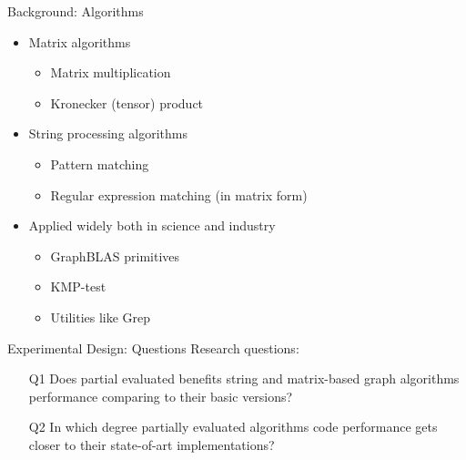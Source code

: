 \documentclass{beamer}
\begin{document}
\begin{frame}{Background: Algorithms}

	\begin{itemize}
		\item Matrix algorithms
		\begin{itemize}
			\item Matrix multiplication
			\item Kronecker (tensor) product
		\end{itemize}\vfill
		\item String processing algorithms
		\begin{itemize}
			\item Pattern matching
			\item Regular expression matching (in matrix form)
		\end{itemize}\vfill
		\item Applied widely both in science and industry
		\begin{itemize}
			\item GraphBLAS primitives
			\item KMP-test
			\item Utilities like Grep
		\end{itemize}
	\end{itemize}
\end{frame}



\begin{frame}{Experimental Design: Questions}
	Research questions: \vfill
	\begin{itemize}
	\item[Q1] Does partial evaluated benefits string and matrix-based
	graph algorithms performance comparing to their basic versions?\vfill
	\item[Q2] In which degree partially evaluated algorithms code performance gets closer to their state-of-art implementations?
	\end{itemize}
\end{frame}
\end{document}

